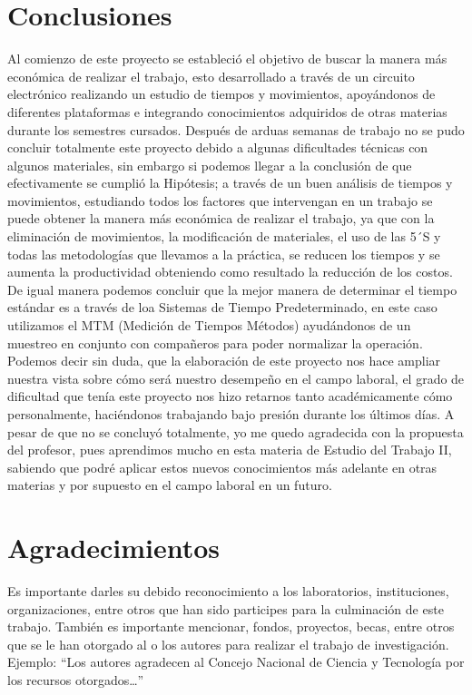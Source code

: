     \section{Conclusiones}
    Al comienzo de este proyecto se estableció el objetivo de buscar la manera más económica de realizar el trabajo, esto desarrollado a través de un circuito electrónico realizando un estudio de tiempos y movimientos, apoyándonos de diferentes plataformas e integrando conocimientos adquiridos de otras materias durante los semestres cursados.
    Después de arduas semanas de trabajo no se pudo concluir totalmente este proyecto debido a algunas dificultades técnicas con algunos materiales, sin embargo si podemos llegar a la conclusión de que efectivamente se cumplió la Hipótesis; a través de un buen análisis de tiempos y movimientos, estudiando todos los factores que intervengan en un trabajo se puede obtener la manera más económica de realizar el trabajo, ya que con la eliminación de movimientos, la modificación de materiales, el uso de las 5´S y todas las metodologías que llevamos a la práctica, se reducen los tiempos y se aumenta la productividad  obteniendo como resultado la reducción de los costos.
    De igual manera podemos concluir que la mejor manera de determinar el tiempo estándar es a través de loa Sistemas de Tiempo Predeterminado, en este caso utilizamos el MTM (Medición de Tiempos Métodos) ayudándonos de un muestreo en conjunto con compañeros para poder normalizar la operación.
    Podemos decir sin duda, que la elaboración de este proyecto nos hace ampliar nuestra vista sobre cómo será nuestro desempeño en el campo laboral, el grado de dificultad que tenía este proyecto nos hizo retarnos tanto académicamente cómo personalmente, haciéndonos trabajando bajo presión durante los últimos días. A pesar de que no se concluyó totalmente, yo me quedo agradecida con la propuesta del profesor, pues aprendimos mucho en esta materia de Estudio del Trabajo II, sabiendo que podré aplicar estos nuevos conocimientos más adelante en otras materias y por supuesto en el campo laboral en un futuro.
    \section{Agradecimientos}
    
    Es importante darles su debido reconocimiento a los laboratorios, instituciones, organizaciones, entre otros que han sido participes para la culminación de este trabajo. También es importante mencionar, fondos, proyectos, becas, entre otros que se le han otorgado al o los autores para realizar el trabajo de investigación. Ejemplo: “Los autores agradecen al Concejo Nacional de Ciencia y Tecnología por los recursos otorgados…”
    
